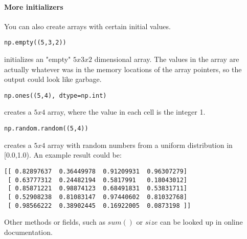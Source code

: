 \paragraph{More initializers} You can also create arrays with certain initial values.

\begin{lstlisting}[style=python]
np.empty((5,3,2))
\end{lstlisting}

\noindent initializes an "empty" $5x3x2$ dimensional array. The values in the array are actually whatever was in the memory locations of the array pointers, so the output could look like garbage.

\begin{lstlisting}[style=python]
np.ones((5,4), dtype=np.int)
\end{lstlisting}

\noindent creates a $5x4$ array, where the value in each cell is the integer 1.

\begin{lstlisting}[style=python]
np.random.random((5,4))
\end{lstlisting}

\noindent creates a $5x4$ array with random numbers from a uniform distribution in [0.0,1.0). An example result could be:

\begin{lstlisting}[style=python]
[[ 0.82897637  0.36449978  0.91209931  0.96307279]
 [ 0.63777312  0.24482194  0.5817991   0.18043012]
 [ 0.85871221  0.98874123  0.68491831  0.53831711]
 [ 0.52908238  0.81083147  0.97440602  0.81032768]
 [ 0.98566222  0.38902445  0.16922005  0.0873198 ]]
\end{lstlisting}

\noindent Other methods or fields, such as $sum()$ or $size$ can be looked up in online documentation.